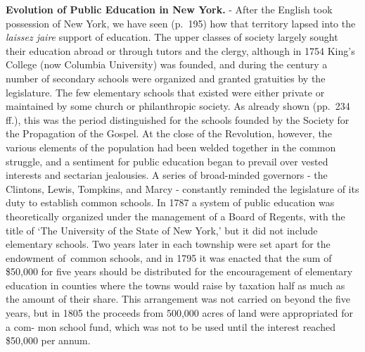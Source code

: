 \documentclass[]{book}
\begin{document}
\textbf{Evolution of Public Education in New York.} - After the English took possession of New York, we have seen (p.~195) how that territory lapsed into the \emph{laissez jaire} support of education. The upper classes of society largely sought their education abroad or through tutors and the clergy, although in 1754 King's College (now Columbia University) was founded, and during the century a number of secondary schools were organized and granted gratuities by the legislature. The few elementary schools that existed were either private or maintained by some church or philanthropic society. As already shown (pp.~234 ff.), this was the period distinguished for the schools founded by the Society for the Propagation of the Gospel. At the close of the Revolution, however, the various elements of the population had been welded together in the common struggle, and a sentiment for public education began to prevail over vested interests and sectarian jealousies. A series of broad-minded governors - the Clintons, Lewis, Tompkins, and Marcy - constantly reminded the legislature of its duty to establish common schools. In 1787 a system of public education was theoretically organized under the management of a Board of Regents, with the title of `The University of the State of New York,' but it did not include elementary schools. Two years later in each township were set apart for the endowment of~common schools, and in 1795 it was enacted that the sum of \$50,000 for five years should be distributed for the encouragement of elementary education in counties where the towns would raise by taxation half as much as the amount of their share. This arrangement was not carried on beyond the five years, but in 1805 the proceeds from 500,000 acres of land were appropriated for a com- mon school fund, which was not to be used until the interest reached \$50,000 per annum.
\end{document}
